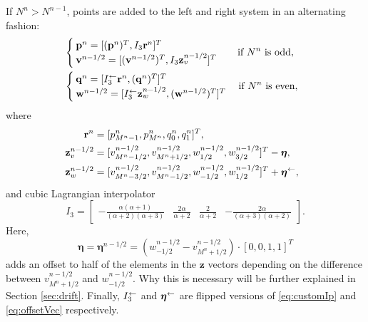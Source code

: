 If $N^n>N^{n-1}$, points are added to the left and right system in an alternating fashion: %
\begin{equation}\label{eq:addingPoint}
    \begin{aligned}
        \!\!\!\!\!&\begin{cases}
            \mathbf{p}^n = [(\mathbf{p}^n)^T, I_3\mathbf{r}^n]^T\\
            \mathbf{v}^{n-1/2} = [(\mathbf{v}^{n-1/2})^T, I_3\mathbf{z}_v^{n-1/2}]^T
        \end{cases}
        \quad\!\text{if $N^n $ is odd},\\
        \!\!\!\!\!&\begin{cases}
            \mathbf{q}^n = [I_3^\flip\mathbf{r}^n, (\mathbf{q}^n)^T]^T\\
            \mathbf{w}^{n-1/2} = [ I_3^\flip\mathbf{z}_w^{n-1/2},(\mathbf{w}^{n-1/2})^T]^T
        \end{cases}\text{if $ N^n$ is even},
    \end{aligned}
\end{equation}
where
\begin{equation}\label{eq:interpVecs}
    \begin{aligned}
        \!\!\!\!\mathbf{r}^n &= [p_{M^n-1}^n, p_{M^n}^n, q_0^n, q_1^n]^T,\\
        \!\!\!\!\mathbf{z}_v^{n-1/2} &= [v_{M^n-1/2}^{n-1/2}, v_{M^n+1/2}^{n-1/2}, w_{1/2}^{n-1/2}, w_{3/2}^{n-1/2}]^T - \boldsymbol{\eta},\\
        \!\!\!\!\mathbf{z}_w^{n-1/2} &= [v_{M^n-3/2}^{n-1/2}, v_{M^n-1/2}^{n-1/2}, w_{-1/2}^{n-1/2}, w_{1/2}^{n-1/2}]^T+ \boldsymbol{\eta}^{\flip},%
    \end{aligned}
\end{equation}
and cubic Lagrangian interpolator
\begin{equation}\label{eq:customIp}
    I_3 = \begin{bmatrix} -\frac{\alpha(\alpha+1)}{(\alpha+2)(\alpha+3)} &\frac{2\alpha}{\alpha+2} &\frac{2}{\alpha+2} 
    &-\frac{2\alpha}{(\alpha+3)(\alpha+2)}
    \end{bmatrix}.
\end{equation}
Here, 
\begin{equation}\label{eq:offsetVec}
    \boldsymbol{\eta} = \boldsymbol{\eta}^{n-1/2}= \left(w_{-1/2}^{n-1/2}-v_{M^n+1/2}^{n
    -1/2}\right)\cdot[0, 0, 1, 1]^T 
\end{equation}
adds an offset to half of the elements in the $\mathbf{z}$ vectors depending on the difference between $v_{M^n+1/2}^{n-1/2}$ and $w_{-1/2}^{n-1/2}$. Why this is necessary will be further explained in Section \ref{sec:drift}. Finally, $I_3^\leftarrow$ and $\boldsymbol{\eta}^{\leftarrow}$ are flipped versions of \eqref{eq:customIp} and \eqref{eq:offsetVec} respectively.

